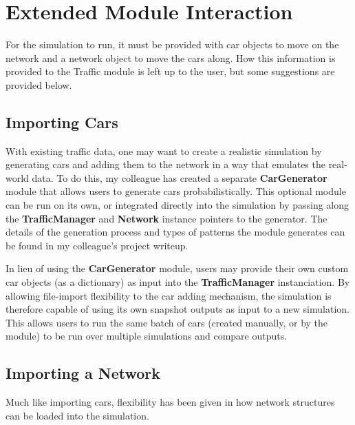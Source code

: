 \section{Extended Module Interaction}

\par For the simulation to run, it must be provided with car objects to move on the network and a network object to move the cars along.  How this information is provided to the Traffic module is left up to the user, but some suggestions are provided below.

\subsection{Importing Cars}

\par With existing traffic data, one may want to create a realistic simulation by generating cars and adding them to the network in a way that emulates the real-world data.  To do this, my colleague has created a separate \textbf{CarGenerator} module that allows users to generate cars probabilistically.  This optional module can be run on its own, or integrated directly into the simulation by passing along the \textbf{TrafficManager} and \textbf{Network} instance pointers to the generator.  The details of the generation process and types of patterns the module generates can be found in my colleague's project writeup. \\

\par In lieu of using the \textbf{CarGenerator} module, users may provide their own custom car objects (as a dictionary) as input into the \textbf{TrafficManager} instanciation.  By allowing file-import flexibility to the car adding mechanism, the simulation is therefore capable of using its own snapshot outputs as input to a new simulation.  This allows users to run the same batch of cars (created manually, or by the module) to be run over multiple simulations and compare outputs.



\subsection{Importing a Network}

\par Much like importing cars, flexibility has been given in how network structures can be loaded into the simulation.  \\

